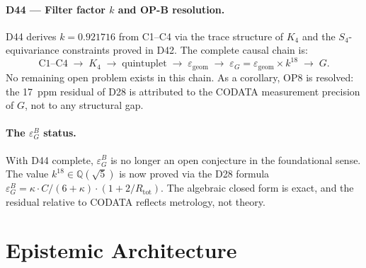 \documentclass[11pt,a4paper]{article}
\theoremstyle{plain}
\theoremstyle{definition}
\theoremstyle{remark}
\newcommand{\Rtot}{R_{\mathrm{tot}}}
\newcommand{\epsGeomB}{\varepsilon_G^B}
\begin{document}
\paragraph{D44 --- Filter factor $k$ and OP-B resolution.} D44 derives $k = 0.921716$ from C1--C4 via the trace structure of $K_4$ and the $S_4$-equivariance constraints proved in D42. The complete causal chain is:
\begin{equation*}
  \text{C1--C4} \;\to\; K_4 \;\to\; \text{quintuplet} \;\to\; \varepsilon_{\mathrm{geom}} \;\to\; \varepsilon_G = \varepsilon_{\mathrm{geom}} \times k^{18} \;\to\; G.
\end{equation*}
No remaining open problem exists in this chain. As a corollary, OP8 is resolved: the 17~ppm residual of D28 is attributed to the CODATA measurement precision of $G$, not to any structural gap.

\paragraph{The $\epsGeomB$ status.} With D44 complete, $\epsGeomB$ is no longer an open conjecture in the foundational sense. The value $k^{18} \in \mathbb{Q}(\sqrt{5})$ is now proved via the D28 formula $\epsGeomB = \kappa \cdot C/(6+\kappa) \cdot (1+2/\Rtot)$. The algebraic closed form is exact, and the residual relative to CODATA reflects metrology, not theory.

\section{Epistemic Architecture}
\label{sec:epistemic}
\end{document}

